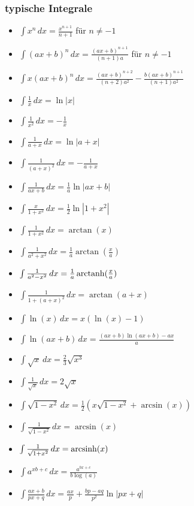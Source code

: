 \subsubsection{typische Integrale}
\begin{itemize}[leftmargin=*]
	\item $\int x^n \, dx = \frac{x^{n+1}}{n+1}$ \hspace{0.3cm} für $n \neq -1$
  	\item $\int(ax + b)^n \,dx = \frac{(ax + b)^{n+1}}{(n + 1)a}$ \hspace{0.3cm} für $n \neq -1$
	\item $\int x(ax+b)^n \,dx = \frac{(ax + b)^{n+2}}{(n+2)a^2} - \frac{b(ax+b)^{n+1}}{(n+1)a^2}$

  	\item $\int \frac{1}{x} \,dx = \ln |x|$
	\item $\int \frac{1}{x^2} \,dx = -\frac{1}{x}$
  	\item $\int \frac{1}{a+x} \,dx = \ln |a+x|$
  	\item $\int \frac{1}{(a+x)^2} \,dx = - \frac{1}{a+x}$
	\item $\int \frac{1}{ax+b} \,dx = \frac{1}{a} \ln |ax+b|$
	\item $\int \frac{x}{1 + x^2} \, dx = \frac{1}{2} \ln |1 + x^2|$

	\item $\int \frac{1}{1 + x^2} \, dx = \arctan(x)$
	\item $\int \frac{1}{a^2 + x^2} \,dx = \frac{1}{a} \arctan(\frac{x}{a})$
	\item $\int \frac{1}{a^2 - x^2} \,dx = \frac{1}{a} \operatorname{arctanh}(\frac{x}{a})$
	\item $\int \frac{1}{1 + (a + x)^2} \, dx = \arctan(a + x)$
	
	
  	\item $\int \ln(x) \,dx = x(\ln(x) - 1)$
  	\item $\int \ln(ax + b) \,dx = \frac{(a x+b) \ln (a x+b)-a x}{a}$
	
	\item $\int \sqrt{x} \,dx = \frac{2}{3}\sqrt{x^3}$
	\item $\int \frac{1}{\sqrt{x}} \,dx = 2 \sqrt{x}$	
	\item $\int \sqrt{1-x^2} \,dx = \frac{1}{2}\left( x\sqrt{1-x^2}+ \arcsin(x) \right)$
	\item $\int \frac{1}{\sqrt{1 - x^2}} \, dx = \arcsin(x)$
	\item $\int \frac{1}{\sqrt{1 + x^2}} \, dx = \operatorname{arcsinh}(x)$

	\item $\int a^{xb + c} \,dx = \frac{a^{bx + c}}{b \log(a)}$
	\item $\int \frac{ax + b}{px + q} \,dx = \frac{ax}{p} + \frac{bp - aq}{p^2} \ln |px+q|$
\end{itemize}


